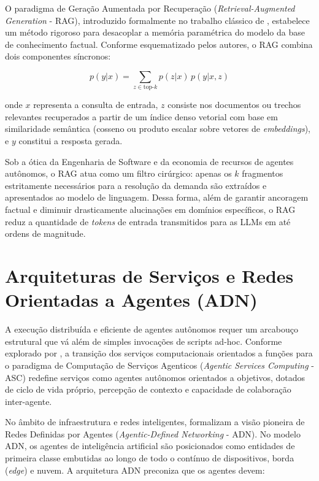O paradigma de Geração Aumentada por Recuperação (\textit{Retrieval-Augmented Generation} - RAG), introduzido formalmente no trabalho clássico de , estabelece um método rigoroso para desacoplar a memória paramétrica do modelo da base de conhecimento factual. Conforme esquematizado pelos autores, o RAG combina dois componentes síncronos:

\begin{equation}
    p(y|x) = \sum_{z \in \text{top-}k} p(z|x) \, p(y|x, z)
\end{equation}

\noindent onde $x$ representa a consulta de entrada, $z$ consiste nos documentos ou trechos relevantes recuperados a partir de um índice denso vetorial com base em similaridade semântica (cosseno ou produto escalar sobre vetores de \textit{embeddings}), e $y$ constitui a resposta gerada.

Sob a ótica da Engenharia de Software e da economia de recursos de agentes autônomos, o RAG atua como um filtro cirúrgico: apenas os $k$ fragmentos estritamente necessários para a resolução da demanda são extraídos e apresentados ao modelo de linguagem. Dessa forma, além de garantir ancoragem factual e diminuir drasticamente alucinações em domínios específicos, o RAG reduz a quantidade de \textit{tokens} de entrada transmitidos para as LLMs em até ordens de magnitude.

\section{Arquiteturas de Serviços e Redes Orientadas a Agentes (ADN)}

A execução distribuída e eficiente de agentes autônomos requer um arcabouço estrutural que vá além de simples invocações de scripts ad-hoc. Conforme explorado por , a transição dos serviços computacionais orientados a funções para o paradigma de Computação de Serviços Agenticos (\textit{Agentic Services Computing} - ASC) redefine serviços como agentes autônomos orientados a objetivos, dotados de ciclo de vida próprio, percepção de contexto e capacidade de colaboração inter-agente.

No âmbito de infraestrutura e redes inteligentes,  formalizam a visão pioneira de Redes Definidas por Agentes (\textit{Agentic-Defined Networking} - ADN). No modelo ADN, os agentes de inteligência artificial são posicionados como entidades de primeira classe embutidas ao longo de todo o contínuo de dispositivos, borda (\textit{edge}) e nuvem. A arquitetura ADN preconiza que os agentes devem:

